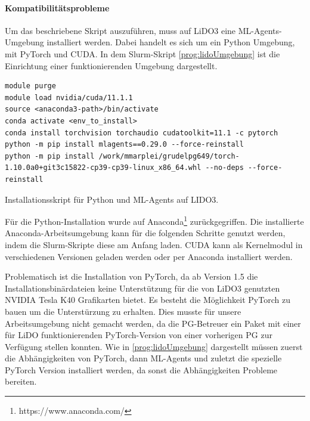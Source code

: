 \paragraph{Kompatibilitätsprobleme}
Um das beschriebene Skript auszuführen, muss auf LiDO3 eine ML-Agents-Umgebung installiert werden. Dabei handelt es sich um ein Python Umgebung, mit PyTorch und CUDA. In dem Slurm-Skript \ref{prog:lidoUmgebung} ist die Einrichtung einer funktionierenden Umgebung dargestellt. 

\begin{listing}
	\begin{verbatim}
module purge
module load nvidia/cuda/11.1.1
source <anaconda3-path>/bin/activate
conda activate <env_to_install>
conda install torchvision torchaudio cudatoolkit=11.1 -c pytorch
python -m pip install mlagents==0.29.0 --force-reinstall
python -m pip install /work/mmarplei/grudelpg649/torch-1.10.0a0+git3c15822-cp39-cp39-linux_x86_64.whl --no-deps --force-reinstall 
	\end{verbatim}
	\caption{Installationsskript für Python und ML-Agents auf LIDO3.}
	\label{prog:lidoUmgebung}
\end{listing}

Für die Python-Installation wurde auf Anaconda\footnote{https://www.anaconda.com/} zurückgegriffen. Die installierte Anaconda-Arbeitsumgebung kann für die folgenden Schritte genutzt werden, indem die Slurm-Skripte diese am Anfang laden. CUDA kann als Kernelmodul in verschiedenen Versionen geladen werden oder per Anaconda installiert werden.

Problematisch ist die Installation von PyTorch, da ab Version 1.5 die Installationsbinärdateien keine Unterstützung für die von LiDO3 genutzten NVIDIA Tesla K40 Grafikarten bietet. Es besteht die Möglichkeit PyTorch zu bauen um die Unterstürzung zu erhalten. Dies musste für unsere Arbeitsumgebung nicht gemacht werden, da die PG-Betreuer ein Paket mit einer für LiDO funktionierenden PyTorch-Version von einer vorherigen PG zur Verfügung stellen konnten. Wie in \ref{prog:lidoUmgebung} dargestellt müssen zuerst die Abhängigkeiten von PyTorch, dann ML-Agents und zuletzt die spezielle PyTorch Version installiert werden, da sonst die Abhängigkeiten Probleme bereiten.

